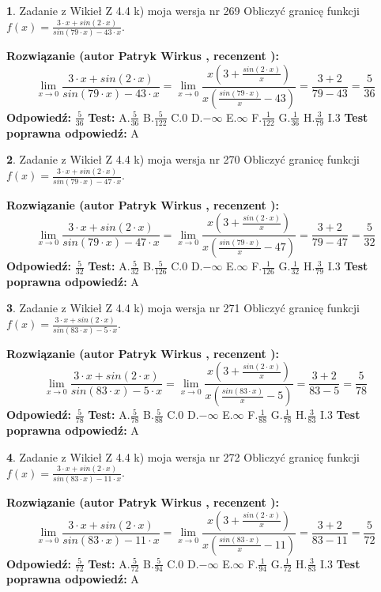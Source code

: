 \documentclass[12pt, a4paper]{article}
\theoremstyle{definition} %
\newtheorem{zad}{}
\newcommand{\zadStart}[1]{\begin{zad}#1\newline}
\newcommand{\zadStop}{\end{zad}}
\newcommand{\rozwStart}[2]{\noindent \textbf{Rozwiązanie (autor #1 , recenzent #2): }\newline}
\newcommand{\rozwStop}{\newline}
\newcommand{\odpStart}{\noindent \textbf{Odpowiedź:}\newline}
\newcommand{\odpStop}{\newline}
\newcommand{\testStart}{\noindent \textbf{Test:}\newline}
\newcommand{\testStop}{\newline}
\newcommand{\kluczStart}{\noindent \textbf{Test poprawna odpowiedź:}\newline}
\newcommand{\kluczStop}{\newline}
\begin{document}
\zadStart{Zadanie z Wikieł Z 4.4 k) moja wersja nr 269}
Obliczyć granicę funkcji $f(x)=\frac{3\cdot x +sin(2\cdot x)}{sin(79\cdot x) -43\cdot x}$.
\zadStop
\rozwStart{Patryk Wirkus}{}
$$\lim\limits_{x\to 0}\frac{3\cdot x +sin(2\cdot x)}{sin(79\cdot x) -43\cdot x}
=\lim\limits_{x\to 0}\frac{x(3+\frac{sin(2\cdot x)}{x})}{x(\frac{sin(79\cdot x)}{x}-43)}
=\frac{3+2}{79-43} = \frac{5}{36}$$
\rozwStop
\odpStart
$\frac{5}{36}$
\odpStop
\testStart
A.$\frac{5}{36}$
B.$\frac{5}{122}$
C.$0$
D.$-\infty$
E.$\infty$
F.$\frac{1}{122}$
G.$\frac{1}{36}$
H.$\frac{3}{79}$
I.$3$
\testStop
\kluczStart
A
\kluczStop



\zadStart{Zadanie z Wikieł Z 4.4 k) moja wersja nr 270}
Obliczyć granicę funkcji $f(x)=\frac{3\cdot x +sin(2\cdot x)}{sin(79\cdot x) -47\cdot x}$.
\zadStop
\rozwStart{Patryk Wirkus}{}
$$\lim\limits_{x\to 0}\frac{3\cdot x +sin(2\cdot x)}{sin(79\cdot x) -47\cdot x}
=\lim\limits_{x\to 0}\frac{x(3+\frac{sin(2\cdot x)}{x})}{x(\frac{sin(79\cdot x)}{x}-47)}
=\frac{3+2}{79-47} = \frac{5}{32}$$
\rozwStop
\odpStart
$\frac{5}{32}$
\odpStop
\testStart
A.$\frac{5}{32}$
B.$\frac{5}{126}$
C.$0$
D.$-\infty$
E.$\infty$
F.$\frac{1}{126}$
G.$\frac{1}{32}$
H.$\frac{3}{79}$
I.$3$
\testStop
\kluczStart
A
\kluczStop



\zadStart{Zadanie z Wikieł Z 4.4 k) moja wersja nr 271}
Obliczyć granicę funkcji $f(x)=\frac{3\cdot x +sin(2\cdot x)}{sin(83\cdot x) -5\cdot x}$.
\zadStop
\rozwStart{Patryk Wirkus}{}
$$\lim\limits_{x\to 0}\frac{3\cdot x +sin(2\cdot x)}{sin(83\cdot x) -5\cdot x}
=\lim\limits_{x\to 0}\frac{x(3+\frac{sin(2\cdot x)}{x})}{x(\frac{sin(83\cdot x)}{x}-5)}
=\frac{3+2}{83-5} = \frac{5}{78}$$
\rozwStop
\odpStart
$\frac{5}{78}$
\odpStop
\testStart
A.$\frac{5}{78}$
B.$\frac{5}{88}$
C.$0$
D.$-\infty$
E.$\infty$
F.$\frac{1}{88}$
G.$\frac{1}{78}$
H.$\frac{3}{83}$
I.$3$
\testStop
\kluczStart
A
\kluczStop



\zadStart{Zadanie z Wikieł Z 4.4 k) moja wersja nr 272}
Obliczyć granicę funkcji $f(x)=\frac{3\cdot x +sin(2\cdot x)}{sin(83\cdot x) -11\cdot x}$.
\zadStop
\rozwStart{Patryk Wirkus}{}
$$\lim\limits_{x\to 0}\frac{3\cdot x +sin(2\cdot x)}{sin(83\cdot x) -11\cdot x}
=\lim\limits_{x\to 0}\frac{x(3+\frac{sin(2\cdot x)}{x})}{x(\frac{sin(83\cdot x)}{x}-11)}
=\frac{3+2}{83-11} = \frac{5}{72}$$
\rozwStop
\odpStart
$\frac{5}{72}$
\odpStop
\testStart
A.$\frac{5}{72}$
B.$\frac{5}{94}$
C.$0$
D.$-\infty$
E.$\infty$
F.$\frac{1}{94}$
G.$\frac{1}{72}$
H.$\frac{3}{83}$
I.$3$
\testStop
\kluczStart
A
\kluczStop
\end{document}
